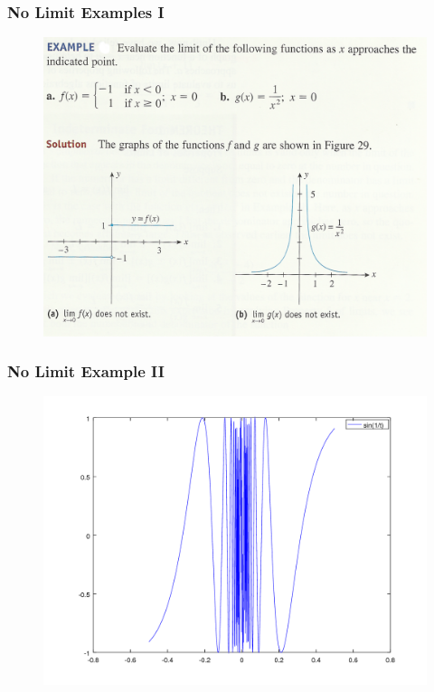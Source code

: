 \documentclass[xcolor=dvipsnames]{beamer}
\begin{document}
\begin{frame}
  \frametitle{No Limit Examples I}
  \begin{figure}[h]
    \includegraphics[scale=.9]{./limita.png}
  \end{figure}
\end{frame}

\begin{frame}
  \frametitle{No Limit Example II}
  \begin{figure}[h]
    \includegraphics[scale=.5]{./sineoneoverx.png}
  \end{figure}
\end{frame}
\end{document}

